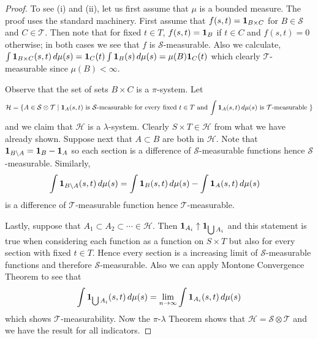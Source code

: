 \begin{proof}
To see (i) and (ii),  let us first assume that $\mu$ is a bounded measure.  The proof uses
the standard machinery.  First assume that $f(s,t)
= \textbf{1}_{B \times C}$ for $B \in \mathcal{S}$ and $C \in
\mathcal{T}$. Then note that for fixed $t \in T$, $f(s,t) = \textbf{1}_{B}$ if $t
\in C$ and $f(s,t) = 0$ otherwise; in both cases we see that $f$ is
$\mathcal{S}$-measurable.  Also we calculate, $\int \textbf{1}_{B
  \times C} (s,t) \,  d \mu(s) = \textbf{1}_{C} (t)\int
\textbf{1}_{B} (s) \,  d \mu(s) = \mu(B) \textbf{1}_{C} (t) $
which clearly $\mathcal{T}$-measurable since $\mu(B) < \infty$.

Observe that the set of sets $B \times C$ is a $\pi$-system.  Let
\begin{align*}
\mathcal{H} = \lbrace A \in \mathcal{S} \otimes \mathcal{T} \mid
\textbf{1}_{A}(s,t) \text{ is $\mathcal{S}$-measurable for every
  fixed $t \in T$ and $\int \textbf{1}_{A}(s,t) \, d\mu(s)$ is $\mathcal{T}$-measurable } \rbrace
\end{align*}
and we claim that $\mathcal{H}$ is a $\lambda$-system.  Clearly $S
\times T \in \mathcal{H}$ from what we have already shown.  Suppose
next that $A \subset B$ are both in $\mathcal{H}$.  Note that
$\textbf{1}_{B \setminus A} = \textbf{1}_{B} -
\textbf{1}_{A}$ so each section is a difference of
$\mathcal{S}$-measurable functions hence $\mathcal{S}$-measurable.
Similarly, 
\begin{align*}
\int \textbf{1}_{B \setminus A} (s,t) \, d\mu(s) &= \int
\textbf{1}_{B} (s,t) \, d\mu(s) - \int
\textbf{1}_{A} (s,t) \, d\mu(s) 
\end{align*}
is a difference of $\mathcal{T}$-measurable function hence
$\mathcal{T}$-measurable.

Lastly, suppose that $A_1 \subset A_2 \subset \cdots \in
\mathcal{H}$.  Then $\textbf{1}_{A_i} \uparrow \textbf{1}_{\bigcup A_i}$ and this statement is true when considering each
function as a function on $S \times T$ but also for every
section with fixed $t \in T$.  Hence every section is a increasing limit of $\mathcal{S}$-measurable
functions and therefore $\mathcal{S}$-measurable.  Also we can apply
Montone Convergence Theorem to see that 
\begin{align*}
\int \textbf{1}_{\bigcup A_i}(s,t) \, d\mu(s) = \lim_{n \to
  \infty} \int \textbf{1}_{A_i}(s,t) \, d\mu(s)
\end{align*}
which shows $\mathcal{T}$-measurability.
Now the
$\pi$-$\lambda$ Theorem shows that $\mathcal{H} =  \mathcal{S} \otimes
\mathcal{T}$ and we have the result for all indicators.  


\end{proof}
